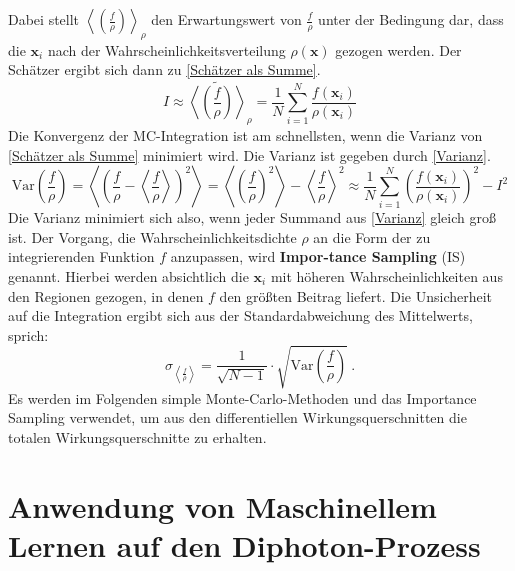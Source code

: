 Dabei stellt $\left\langle \left(\frac{f}{\rho}\right) \right\rangle_{\rho}$  den Erwartungswert von $\frac{f}{\rho}$ unter der Bedingung dar, dass die $\mathbf{x}_i$ nach der Wahrscheinlichkeitsverteilung $\rho(\mathbf{x})$ gezogen werden. Der Schätzer ergibt sich dann zu \textsf{\autoref{Schätzer als Summe}}.
\begin{equation}
I \approx \tilde{\left\langle \left(\frac{f}{\rho}\right) \right\rangle}_{\rho}  = \frac{1}{N}\sum_{i=1}^{N}\frac{f(\mathbf{x}_i)}{\rho(\mathbf{x}_i)}
\label{Schätzer als Summe}
\end{equation}
Die Konvergenz der MC-Integration ist am schnellsten, wenn die Varianz von \textsf{\autoref{Schätzer als Summe}} minimiert wird. Die Varianz ist gegeben durch \textsf{\autoref{Varianz}}.
\begin{equation}
\text{Var}\left(\frac{f}{\rho}\right) = \left\langle\left(\frac{f}{\rho} - \left\langle \frac{f}{\rho}\right\rangle \right)^2 \right\rangle = \left\langle \left(\frac{f}{\rho}\right)^2 \right\rangle - \left\langle\frac{f}{\rho} \right\rangle^2 \approx \frac{1}{N} \sum_{i=1}^{N}\left(\frac{f(\mathbf{x}_i)}{\rho(\mathbf{x}_i)}\right)^2 - I^2
\label{Varianz}
\end{equation}
Die Varianz minimiert sich also, wenn jeder Summand aus \textsf{\autoref{Varianz}} gleich groß ist. Der Vorgang, die Wahrscheinlichkeitsdichte $\rho$ an die Form der zu integrierenden Funktion $f$ anzupassen, wird \textbf{Impor-tance Sampling} (IS) genannt. Hierbei werden absichtlich die $\mathbf{x}_i$ mit höheren Wahrscheinlichkeiten aus den Regionen gezogen, in denen $f$ den größten Beitrag liefert. Die Unsicherheit auf die Integration ergibt sich aus der Standardabweichung des Mittelwerts, sprich:
\begin{equation}
\sigma_{\left\langle \frac{f}{\rho}\right\rangle} = \frac{1}{\sqrt{N-1}} \cdot \sqrt{\text{Var}\left(\frac{f}{\rho}\right)}~.
\label{uncertainty-mc}
\end{equation}
Es werden im Folgenden simple Monte-Carlo-Methoden und das Importance Sampling verwendet, um aus den differentiellen Wirkungsquerschnitten die totalen Wirkungsquerschnitte zu erhalten.   
\chapter{Anwendung von Maschinellem Lernen auf den Diphoton-Prozess}
\label{4}
